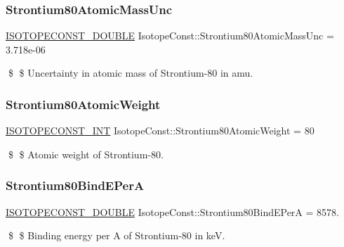 \subsubsection{\texorpdfstring{Strontium80\+Atomic\+Mass\+Unc}{Strontium80AtomicMassUnc}}
{\footnotesize\ttfamily \mbox{\hyperlink{group___isotope_const-_macros_ga8f45a7272ce02c0b4c65c44636ed719a}{I\+S\+O\+T\+O\+P\+E\+C\+O\+N\+S\+T\+\_\+\+D\+O\+U\+B\+LE}} Isotope\+Const\+::\+Strontium80\+Atomic\+Mass\+Unc = 3.\+718e-\/06}

\$ \$ Uncertainty in atomic mass of Strontium-\/80 in amu. \mbox{\label{group___isotope_const-_strontium-_sr80_ga487254f31f4c55f42d5306b069ce0083}} 
\subsubsection{\texorpdfstring{Strontium80\+Atomic\+Weight}{Strontium80AtomicWeight}}
{\footnotesize\ttfamily \mbox{\hyperlink{group___isotope_const-_macros_ga5f18360b3e99483a35c32d789e62621c}{I\+S\+O\+T\+O\+P\+E\+C\+O\+N\+S\+T\+\_\+\+I\+NT}} Isotope\+Const\+::\+Strontium80\+Atomic\+Weight = 80}

\$ \$ Atomic weight of Strontium-\/80. \mbox{\label{group___isotope_const-_strontium-_sr80_ga48e879f271b12006bb75e049b74552ff}} 
\subsubsection{\texorpdfstring{Strontium80\+Bind\+E\+PerA}{Strontium80BindEPerA}}
{\footnotesize\ttfamily \mbox{\hyperlink{group___isotope_const-_macros_ga8f45a7272ce02c0b4c65c44636ed719a}{I\+S\+O\+T\+O\+P\+E\+C\+O\+N\+S\+T\+\_\+\+D\+O\+U\+B\+LE}} Isotope\+Const\+::\+Strontium80\+Bind\+E\+PerA = 8578.}

\$ \$ Binding energy per A of Strontium-\/80 in keV. \mbox{\label{group___isotope_const-_strontium-_sr80_ga8ac2ef36f8a1ee3d4615ab43f6077832}} 
